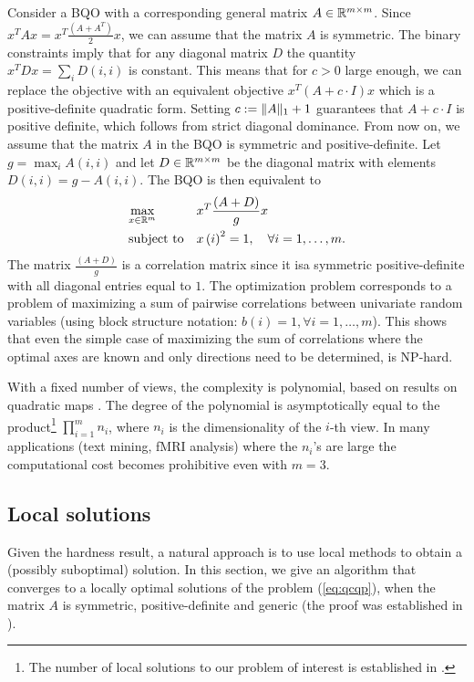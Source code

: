  Consider a BQO with a corresponding general matrix $A \in \mathbb{R}^{m\times m}$. Since $x^T A x = x^T
\frac{\left(A + A^T\right)}{2} x$, we can assume that the matrix $A$ is
symmetric. The binary constraints imply that for any diagonal
matrix $D$ the quantity $x^T D x = \sum_i D\left(i,i\right)$ is
constant. This means that for $c > 0$ large enough, we can
replace the objective with an equivalent objective $x^T \left(A + c
\cdot I\right) x$ which is a positive-definite quadratic form. Setting $c := \lVert A\rVert_1 + 1$ guarantees that $A + c\cdot I$ is positive definite, which follows from strict diagonal dominance. From
now on, we assume that the matrix $A$ in the BQO is symmetric and
positive-definite.  Let $g = \max_i{A\left(i,i\right)}$ and let $D \in
\mathbb{R}^{m\times m}$ be the diagonal matrix with elements $D\left(i,i\right) = g -
A\left(i,i\right)$. The BQO is then equivalent to
\begin{equation}\label{eq:binqpcor}
\begin{aligned}
& \underset{x \in \mathbb{R}^m}{\text{max}}
& & x^T \frac{\left(A + D\right)}{g} x  \\
& \text{subject to}
& & x\left(i\right)^2 = 1,  \quad\forall i =1,\ldots,m.\\
\end{aligned}
\end{equation}
The matrix $\frac{\left(A + D\right)}{g}$ is a correlation matrix since it
isa symmetric positive-definite with all diagonal entries
equal to $1$. The optimization problem corresponds to a problem
of maximizing a sum of pairwise correlations between univariate
random variables (using block structure notation: $b\left(i\right) = 1,
\forall i = 1,\ldots, m$). This shows that even the simple case
of maximizing the sum of correlations where the optimal axes are
known and only directions need to be determined, is NP-hard.

With a fixed number of views, the complexity is polynomial, based on results on quadratic maps \cite{Grigoriev}. The degree of the polynomial is asymptotically equal to the product\footnote{The number of local solutions to our problem of interest is established in \cite{Chu}.} $\prod_{i=1}^m n_i$, where $n_i$ is the dimensionality of the $i$-th view.
In many applications (text mining, fMRI analysis) where the $n_i$'s are large the computational cost becomes prohibitive even with $m=3$.


\subsection{Local solutions}\label{subsec:horst}
Given the hardness result, a
natural approach is to use local methods to obtain a (possibly suboptimal)
solution.  In this section, we give an algorithm that converges to a locally optimal solutions of the problem (\ref{eq:qcqp}), when the matrix $A$ is symmetric,
positive-definite and generic (the proof was established in \cite{Chu}).

